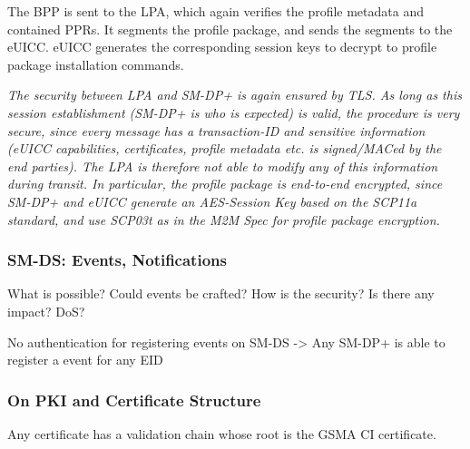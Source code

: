 The BPP is sent to the LPA, which again verifies the profile metadata and contained PPRs. It segments the profile package, and sends the segments to the eUICC. eUICC generates the corresponding session keys to decrypt to profile package installation commands. 

\textit{The security between LPA and SM-DP+ is again ensured by TLS. As long as this session establishment (SM-DP+ is who is expected) is valid, the procedure is very secure, since every message has a transaction-ID and sensitive information (eUICC capabilities, certificates, profile metadata etc. is signed/MACed by the end parties). The LPA is therefore not able to modify any of this information during transit. In particular, the profile package is end-to-end encrypted, since SM-DP+ and eUICC generate an AES-Session Key based on the SCP11a standard, and use SCP03t as in the M2M Spec for profile package encryption.}



\subsubsection{SM-DS: Events, Notifications}
What is possible? Could events be crafted? How is the security? Is there any impact? DoS?

No authentication for registering events on SM-DS -> Any SM-DP+ is able to register a event for any EID

\subsubsection{On PKI and Certificate Structure}
Any certificate has a validation chain whose root is the GSMA CI certificate. 

